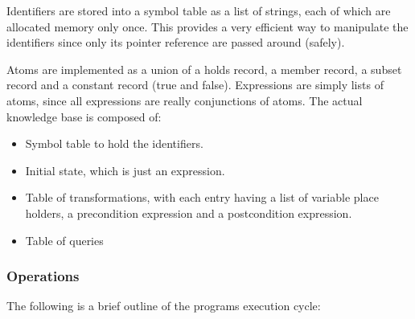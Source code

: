 \documentclass[a4paper]{article}
\begin{document}
        Identifiers are stored into a symbol table as a list of strings, each
        of which are allocated memory only once. This provides a very
        efficient way to manipulate the identifiers since only its pointer
        reference are passed around (safely).

        Atoms are implemented as a union of a holds record, a member record,
        a subset record and a constant record (true and false). Expressions
        are simply lists of atoms, since all expressions are really
        conjunctions of atoms. The actual knowledge base is composed of:

        \begin{itemize}
          \item
            Symbol table to hold the identifiers.
          \item
            Initial state, which is just an expression.
          \item
            Table of transformations, with each entry having a list of
            variable place holders, a precondition expression and a
            postcondition expression.
          \item
            Table of queries
        \end{itemize}

      \subsubsection{Operations}

        The following is a brief outline of the programs execution cycle:
\end{document}

